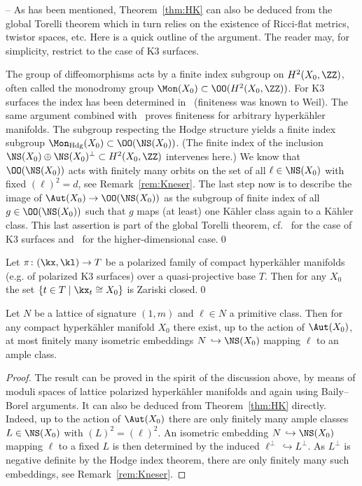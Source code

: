 -- As has been mentioned, Theorem~\ref{thm:HK} can also be deduced from the global Torelli theorem which in turn relies on the existence of Ricci-flat metrics, twistor spaces, etc. Here is a quick outline of the argument. The reader may, for simplicity, restrict to the case of K3 surfaces.

The group of diffeomorphisms acts by a finite index subgroup on $H^2(X_0,\ZZ)$, often called the monodromy group $\Mon(X_0)\subset \OO(H^2(X_0,\ZZ))$. For K3 surfaces the index has been determined in~\cite{Borcea} (finiteness was known to Weil). The same argument combined with~\cite{HuyFin} proves finiteness for arbitrary hyperk\"ahler manifolds. The subgroup respecting the Hodge structure yields a finite index subgroup $\Mon_{\rm Hdg}(X_0)\subset\OO(\NS(X_0))$. (The finite index of the inclusion $\NS(X_0)\oplus\NS(X_0)^\perp\subset H^2(X_0,\ZZ)$ intervenes here.) We know that $\OO(\NS(X_0))$ acts with finitely many orbits on the set of all $\ell\in\NS(X_0)$ with fixed $(\ell)^2=d$, see Remark~\ref{rem:Kneser}. The last step now is to describe the image of $\Aut(X_0)\to \OO(\NS(X_0))$ as the subgroup of finite index of all $g\in \OO(\NS(X_0))$ such that $g$ maps (at least) one K\"ahler class again to a K\"ahler class. This last assertion is part of the global Torelli theorem, cf.~\cite[Chapter~15]{HuyK3} for the case of K3 surfaces and~\cite{Mar,Verb} for the higher-dimensional case.\qed


\begin{coro}
Let $\pi\colon(\kx,\kl)\to T$ be a polarized family of compact hyperk\"ahler manifolds (e.g. of polarized K3 surfaces) over a quasi-projective base $T$. Then for any $X_0$ the set $\{t\in T\mid \kx_t\cong X_0\}$ is Zariski closed.\qed
\end{coro}

\begin{coro}
Let $N$ be a lattice of signature $(1,m)$ and $\ell\in N$ a primitive class. Then for any compact hyperk\"ahler manifold $X_0$ there exist, up to the action of $\Aut(X_0)$, at most finitely many isometric embeddings $N\,\hookrightarrow \NS(X_0)$ mapping $\ell$ to an ample class.
\end{coro}

\begin{proof}
The result can be proved in the spirit of the discussion above, by means of moduli spaces of lattice polarized hyperk\"ahler manifolds and again using Baily--Borel arguments. It can also be deduced from Theorem~\ref{thm:HK} directly. Indeed, up to the action of $\Aut(X_0)$ there are only finitely many ample classes $L\in\NS(X_0)$ with $(L)^2=(\ell)^2$. An isometric embedding $N\,\hookrightarrow \NS(X_0)$ mapping $\ell$ to a fixed $L$ is then determined by the induced $\ell^\perp\,\hookrightarrow L^\perp$. As $L^\perp$ is negative definite by the Hodge index theorem, there are only finitely many such embeddings, see Remark~\ref{rem:Kneser}.
\end{proof}


